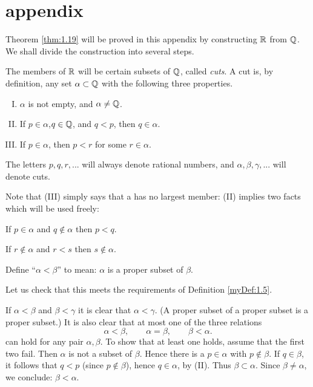 \section*{appendix}
Theorem \ref{thm:1.19} will be proved in this appendix 
by constructing ${\protect\mathbb R}$ from ${\protect\mathbb Q}$. 
We shall divide the construction into several steps.

The members of ${\protect\mathbb R}$ will be certain subsets of ${\protect\mathbb Q}$, called \emph{cuts}. 
A cut is, by definition, 
any set $\alpha \subset {\protect\mathbb Q}$ with the following three properties.
\begin{enumerate}[(I)]
    \item $\alpha$ is not empty, and $\alpha \neq {\protect\mathbb Q}$.
    \item If $p\in \alpha$,$q \in {\protect\mathbb Q}$, and $q <p$, then $q \in \alpha$.
    \item If $p \in \alpha$, then $p <r$ for some $r\in \alpha$.
\end{enumerate}

The letters $p, q, r, ...$ will always denote rational numbers, 
and $\alpha, \beta, \gamma, ...$ will denote cuts.

Note that (III) simply says that a has no largest member: 
(II) implies two facts which will be used freely:

If $p\in\alpha$ and $q\not\in\alpha$ then $p<q$.

If $r\not\in \alpha$ and $r<s$ then $s\not\in \alpha$.

Define ``$\alpha < \beta$'' to mean: 
$\alpha$ is a proper subset of $\beta$.

Let us check that this meets the requirements of Definition \ref{myDef:1.5}.

If $\alpha < \beta$ and $\beta < \gamma$ it is clear that $\alpha < \gamma$. 
(A proper subset of a proper subset is a proper subset.) 
It is also clear that at most one of the three relations
\begin{equation*}
    \alpha < \beta, \qquad
    \alpha = \beta, \qquad
    \beta < \alpha.
\end{equation*}
can hold for any pair $\alpha, \beta$. 
To show that at least one holds, assume that the first two fail. 
Then $\alpha$ is not a subset of $\beta$. 
Hence there is a $p \in \alpha$ with $p \not\in \beta$. 
If $q \in \beta$, it follows that $q <p$ (since $p \not\in \beta$), 
hence $q \in \alpha$, by (II). 
Thus $\beta \subset \alpha$. 
Since $\beta \neq \alpha$, we conclude: $\beta < \alpha$.

